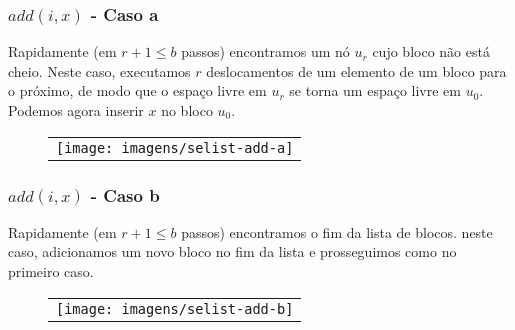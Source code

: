 \documentclass{beamer}
\begin{document}
\begin{frame}[shrink]
\frametitle{$add(i,x)$ - Caso a}
Rapidamente (em $ r+1\le \ensuremath{\ensuremath{\ensuremath{\mathit{b}}}}$ passos) encontramos um nó $ \ensuremath{\ensuremath{\ensuremath{\mathit{u}}}}_r$ cujo bloco não está cheio. Neste caso, executamos $ r$ deslocamentos de um elemento de um bloco para o próximo, de modo que o espaço livre em $ \ensuremath{\ensuremath{\ensuremath{\mathit{u}}}}_r$ se torna um espaço livre em $ \ensuremath{\ensuremath{\ensuremath{\mathit{u}}}}_0$. Podemos agora inserir $ \ensuremath{\ensuremath{\mathit{x}}}$ no bloco $ \ensuremath{\ensuremath{\ensuremath{\mathit{u}}}}_0$. 
\begin{figure}
  \noindent
  \begin{center}
    \begin{tabular}{@{}l@{}}
      \texttt{[image: imagens/selist-add-a]}\\[4ex]
    \end{tabular}
  \end{center}
\end{figure}
\end{frame}

\begin{frame}[shrink]
\frametitle{$add(i,x)$ - Caso b}
Rapidamente (em $ r+1\le \ensuremath{\ensuremath{\ensuremath{\mathit{b}}}}$ passos) encontramos o fim da lista de blocos. neste caso, adicionamos um novo bloco no fim da lista e prosseguimos como no primeiro caso. 
\begin{figure}
  \noindent
  \begin{center}
    \begin{tabular}{@{}l@{}}
      \texttt{[image: imagens/selist-add-b]}\\[4ex]
    \end{tabular}
  \end{center}
\end{figure}
\end{frame}
\end{document}
